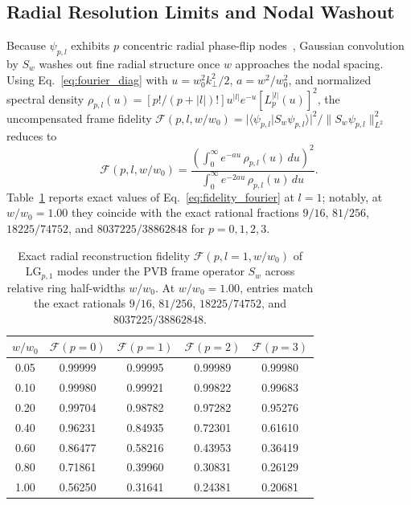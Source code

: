 \documentclass[aps,pra,reprint,amsmath,amssymb,floatfix,longbibliography]{revtex4-2}
\providecommand{\braket}[2]{\langle#1\vert#2\rangle}
\providecommand{\abs}[1]{\lvert#1\rvert}
\providecommand{\norm}[1]{\lVert#1\rVert}
\begin{document}
\subsection{Radial Resolution Limits and Nodal Washout}
\label{subsec:nodal_washout}

Because $\psi_{p,l}$ exhibits $p$ concentric radial phase-flip nodes~\cite{Allen1992,Siegman1986,Walborn2010}, Gaussian convolution by $S_w$ washes out fine radial structure once $w$ approaches the nodal spacing. Using Eq.~\eqref{eq:fourier_diag} with $u = w_0^2 k_\perp^2/2$, $a = w^2/w_0^2$, and normalized spectral density $\rho_{p,l}(u) = [p!/(p+\abs{l})!]u^{\abs{l}} e^{-u}[L_p^{\abs{l}}(u)]^2$, the uncompensated frame fidelity $\mathcal{F}(p,l,w/w_0) = \abs{\braket{\psi_{p,l}}{S_w\psi_{p,l}}}^2/\norm{S_w\psi_{p,l}}_{L^2}^2$ reduces to
\begin{equation}
\mathcal{F}(p,l,w/w_0) = \frac{\left(\int_0^\infty e^{-au}\,\rho_{p,l}(u)\,du\right)^2}{\int_0^\infty e^{-2au}\,\rho_{p,l}(u)\,du}.
\label{eq:fidelity_fourier}
\end{equation}
Table~\ref{tab:fidelity} reports exact values of Eq.~\eqref{eq:fidelity_fourier} at $l = 1$; notably, at $w/w_0 = 1.00$ they coincide with the exact rational fractions $9/16$, $81/256$, $18225/74752$, and $8037225/38862848$ for $p = 0,1,2,3$.

\begin{table}[t]
\caption{Exact radial reconstruction fidelity $\mathcal{F}(p, l=1, w/w_0)$ of $\mathrm{LG}_{p,1}$ modes under the PVB frame operator $S_w$ across relative ring half-widths $w/w_0$. At $w/w_0 = 1.00$, entries match the exact rationals $9/16$, $81/256$, $18225/74752$, and $8037225/38862848$.}
\label{tab:fidelity}
\begin{ruledtabular}
\setlength{\tabcolsep}{3.5pt}
\begin{tabular}{ccccc}
$w / w_0$ & $\mathcal{F}(p=0)$ & $\mathcal{F}(p=1)$ & $\mathcal{F}(p=2)$ & $\mathcal{F}(p=3)$ \\
\hline
0.05 & 0.99999 & 0.99995 & 0.99989 & 0.99980 \\
0.10 & 0.99980 & 0.99921 & 0.99822 & 0.99683 \\
0.20 & 0.99704 & 0.98782 & 0.97282 & 0.95276 \\
0.40 & 0.96231 & 0.84935 & 0.72301 & 0.61610 \\
0.60 & 0.86477 & 0.58216 & 0.43953 & 0.36419 \\
0.80 & 0.71861 & 0.39960 & 0.30831 & 0.26129 \\
1.00 & 0.56250 & 0.31641 & 0.24381 & 0.20681 \\
\end{tabular}
\end{ruledtabular}
\end{table}
\end{document}
